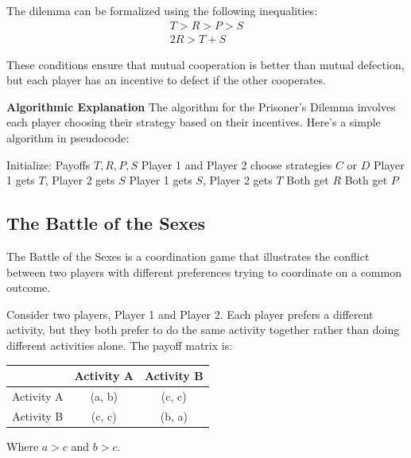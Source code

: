 \documentclass[12pt]{book} %
\begin{document}
The dilemma can be formalized using the following inequalities:
\begin{align}
T > R > P > S \\
2R > T + S
\end{align}

These conditions ensure that mutual cooperation is better than mutual defection, but each player has an incentive to defect if the other cooperates.

\textbf{Algorithmic Explanation}
The algorithm for the Prisoner's Dilemma involves each player choosing their strategy based on their incentives. Here's a simple algorithm in pseudocode:
\FloatBarrier
\begin{algorithm}
\caption{Prisoner's Dilemma Strategy}
\begin{algorithmic}[1]
\State Initialize: Payoffs $T, R, P, S$
\State Player 1 and Player 2 choose strategies $C$ or $D$
    \State Player 1 gets $T$, Player 2 gets $S$
    \State Player 1 gets $S$, Player 2 gets $T$
    \State Both get $R$
\ElsIf
    \State Both get $P$
\EndIf
\end{algorithmic}
\end{algorithm}

\FloatBarrier

\subsection{The Battle of the Sexes}
The Battle of the Sexes is a coordination game that illustrates the conflict between two players with different preferences trying to coordinate on a common outcome.

Consider two players, Player 1 and Player 2. Each player prefers a different activity, but they both prefer to do the same activity together rather than doing different activities alone. The payoff matrix is:

\begin{center}
\begin{tabular}{c|c|c}
 & Activity A & Activity B \\ \hline
Activity A & (a, b) & (c, c) \\ \hline
Activity B & (c, c) & (b, a) \\
\end{tabular}
\end{center}

Where $a > c$ and $b > c$.
\end{document}
